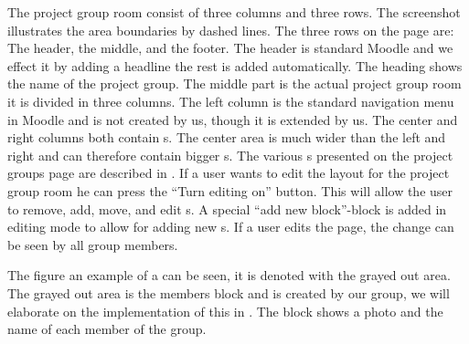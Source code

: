 The project group room consist of three columns and three rows. 
The screenshot illustrates the area boundaries by dashed lines. 
The three rows on the page are: The header, the middle, and the footer. 
The header is standard Moodle and we effect it by adding a headline the rest is added automatically.
The heading shows the name of the project group. 
The middle part is the actual project group room it is divided in three columns. 
The left column is the standard navigation menu in Moodle and is not created by us, though it is extended by us.
The center and right columns both contain \block{}s.
The center area is much wider than the left and right and can therefore contain bigger \block{}s. 
The various \block{}s presented on the project groups page are described in . 
If a user wants to edit the layout for the project group room he can press the ``Turn editing on'' button. 
This will allow the user to remove, add, move, and edit \block{}s. 
A special ``add new block''-block is added in editing mode to allow for adding new \block{}s. 
If a user edits the page, the change can be seen by all group members. 

The figure an example of a \block{} can be seen, it is denoted with the grayed out area.
The grayed out area is the members block and is created by our group, we will elaborate on the implementation of this in . 
The block shows a photo and the name of each member of the group. 



